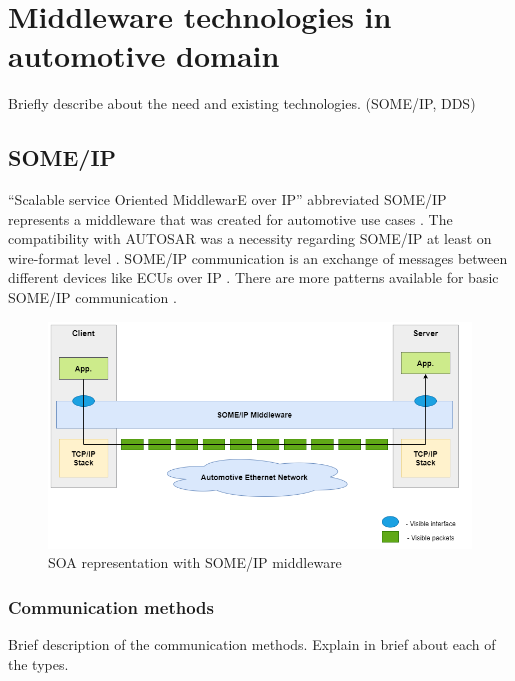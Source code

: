 \section{Middleware technologies in automotive domain}
Briefly describe about the need and existing technologies. (SOME/IP, DDS)

\subsection{SOME/IP}
"`Scalable service Oriented MiddlewarE over IP"' abbreviated SOME/IP represents a middleware that was created for automotive use cases \cite{b1.1}. The compatibility with AUTOSAR was a necessity regarding SOME/IP at least on wire-format level \cite{b1.1}. SOME/IP communication is an exchange of messages between different devices like ECUs over IP \cite{b1.1}. There are more patterns available for basic SOME/IP communication \cite{b1.1}.

\begin{figure}[!htb]
	\centering
		\includegraphics[width=1\textwidth]{images/SOMEIP_Middleware.png}
	\caption{SOA representation with SOME/IP middleware}
	\label{fig:SOMEIP_Middleware}
\end{figure}


\subsubsection{Communication methods}
Brief description of the communication methods. Explain in brief about each of the types.

